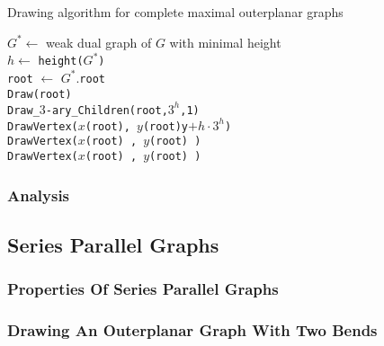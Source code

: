 \begin{algorithm}[H]
	\caption{Drawing algorithm for complete maximal outerplanar graphs}
	$G^* \gets$ weak dual graph of $G$ with minimal height\\
	$h \gets$ \texttt{height($G^*$)}\\
	\texttt{root} $\gets$ $G^*$.\texttt{root}\\
	\texttt{Draw(root)}\\
	\texttt{Draw\_$3$-ary\_Children(\texttt{root},$3^h$,1)}\\
	\texttt{DrawVertex($x$(root), $y$(root)y$+h\cdot 3^h$)}\\
	\texttt{DrawVertex($x$(root) , $y$(root) )}\\
	\texttt{DrawVertex($x$(root) , $y$(root) )}\\
\end{algorithm}


\subsubsection{Analysis}

\subsection{Series Parallel Graphs}

\subsubsection{Properties Of Series Parallel Graphs}

\subsubsection{Drawing An Outerplanar Graph With Two Bends}

